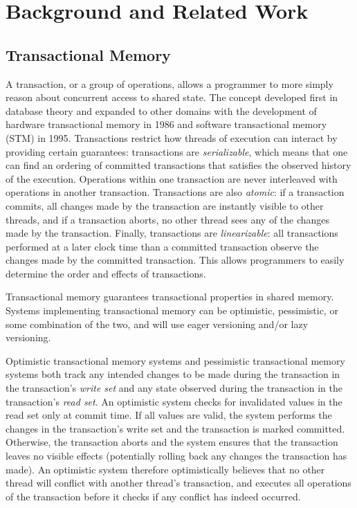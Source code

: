 \chapter{Background and Related Work}
\label{related_work}

\section{Transactional Memory}
A transaction, or a group of operations, allows a programmer to more simply reason about concurrent access to shared state. The concept developed first in database theory and expanded to other domains with the development of hardware transactional memory in 1986 and software transactional memory (STM) in 1995. Transactions restrict how threads of execution can interact by providing certain guarantees: transactions are \emph{serializable}, which means that one can find an ordering of committed transactions that satisfies the observed history of the execution. Operations within one transaction are never interleaved with operations in another transaction. Transactions are also \emph{atomic}: if a transaction commits, all changes made by the transaction are instantly visible to other threads, and if a transaction aborts, no other thread sees any of the changes made by the transaction. Finally, transactions are \emph{linearizable}\cite{linearizability}: all transactions performed at a later clock time than a committed transaction observe the changes made by the committed transaction. This allows programmers to easily determine the order and effects of transactions.

Transactional memory\cite{harristm}\cite{herlihytm} guarantees transactional properties in shared memory. Systems implementing transactional memory can be optimistic, pessimistic, or some combination of the two, and will use eager versioning and/or lazy versioning. 

Optimistic transactional memory systems and pessimistic transactional memory systems\cite{harristm} both track any intended changes to be made during the transaction in the transaction's \emph{write set} and any state observed during the transaction in the transaction's \emph{read set}. 
An optimistic system checks for invalidated values in the read set only at commit time. If all values are valid, the system performs the changes in the transaction's write set and the transaction is marked committed. Otherwise, the transaction aborts and the system ensures that the transaction leaves no visible effects (potentially rolling back any changes the transaction has made). An optimistic system therefore optimistically believes that no other thread will conflict with another thread's transaction, and executes all operations of the transaction before it checks if any conflict has indeed occurred.

